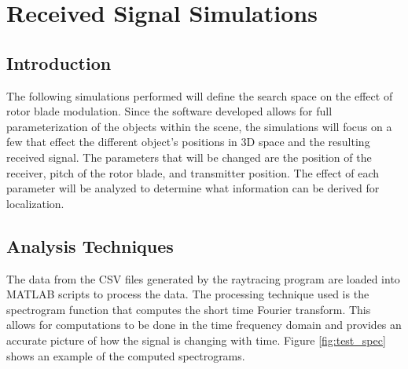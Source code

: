 \chapter{Received Signal Simulations} \label{ch:simulations}

\section{Introduction}
The following simulations performed will define the search space on the effect of rotor blade modulation. Since the software developed allows for full parameterization of the objects within the scene, the simulations will focus on a few that effect the different object's positions in 3D space and the resulting received signal. The parameters that will be changed are the position of the receiver, pitch of the rotor blade, and transmitter position. The effect of each parameter will be analyzed to determine what information can be derived for localization.


\section{Analysis Techniques}
The data from the CSV files generated by the raytracing program are loaded into MATLAB scripts to process the data. The processing technique used is the spectrogram function that computes the short time Fourier transform. This allows for computations to be done in the time frequency domain and provides an accurate picture of how the signal is changing with time. Figure \ref{fig:test_spec} shows an example of the computed spectrograms.


